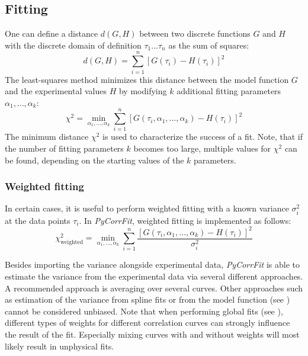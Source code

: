 \subsection{Fitting}
\label{sec:theor.nonle}
One can define a distance $d(G,H)$ between two discrete functions $G$ and $H$ with the discrete domain of definition $\tau_1 \dots \tau_n$ as the sum of squares:
\begin{equation}
d(G,H) = \sum_{i=1}^n \left[ G(\tau_i) - H(\tau_i) \right]^2
\end{equation}
The least-squares method minimizes this distance between the model function $G$ and the experimental values $H$ by modifying $k$ additional fitting parameters $\alpha_1, \dots, \alpha_k$:
\begin{equation}
\chi^2 = \min_{\alpha_1, \dots, \alpha_k} \sum_{i=1}^n \left[ G(\tau_i,\alpha_1, \dots, \alpha_k) - H(\tau_i) \right]^2
\end{equation}
The minimum distance $\chi^2$ is used to characterize the success of a fit. Note, that if the number of fitting parameters $k$ becomes too large, multiple values for $\chi^2$ can be found, depending on the starting values of the $k$ parameters.


\subsubsection{Weighted fitting}
\label{sec:theor.weigh}
In certain cases, it is useful to perform weighted fitting with a known variance $\sigma_i^2$ at the data points $\tau_i$. In \textit{PyCorrFit}, weighted fitting is implemented as follows:
\begin{equation}
\chi^2_\mathrm{weighted} = \min_{\alpha_1, \dots, \alpha_k} \sum_{i=1}^n  \frac{\left[ G(\tau_i,\alpha_1, \dots, \alpha_k) - H(\tau_i) \right]^2}{\sigma_i^2}
\end{equation}

Besides importing the variance alongside experimental data, \textit{PyCorrFit} is able to estimate the variance from the experimental data via several different approaches. A recommended approach is averaging over several curves. Other approaches such as estimation of the variance from spline fits or from the model function (see ) cannot be considered unbiased. 
Note that when performing global fits (see ), different types of weights for different correlation curves can strongly influence the result of the fit. Especially mixing curves with and without weights will most likely result in unphysical fits.


